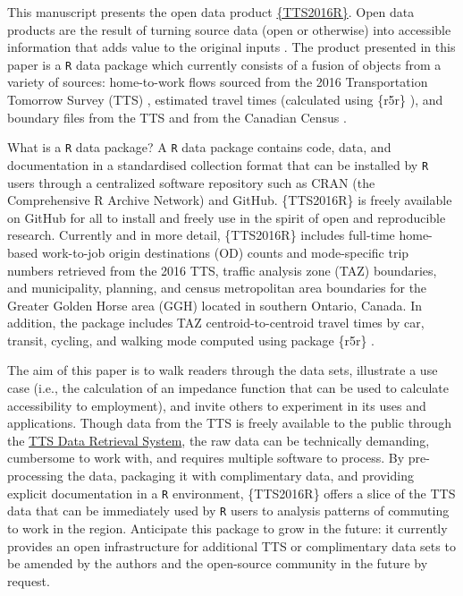 \documentclass[Royal,times,sageh]{sagej}
\begin{document}
This manuscript presents the open data product
\href{https://github.com/soukhova/TTS2016R}{\{TTS2016R\}}. Open data
products are the result of turning source data (open or otherwise) into
accessible information that adds value to the original inputs
\citep[see][]{Arribas2021open}. The product presented in this paper is a
\texttt{R} data package which currently consists of a fusion of objects
from a variety of sources: home-to-work flows sourced from the 2016
Transportation Tomorrow Survey (TTS)
\citep{data_management_group_tts_2018}, estimated travel times
(calculated using \{r5r\} \citep{Pereira2021r5r}), and boundary files
from the TTS \citep{datamanagementgroupSurveyBoundaryFiles2018} and from
the Canadian Census \citep{statisticscanadaBoundaryFiles20162017}.

What is a \texttt{R} data package? A \texttt{R} data package contains
code, data, and documentation in a standardised collection format that
can be installed by \texttt{R} users through a centralized software
repository such as CRAN (the Comprehensive R Archive Network) and
GitHub. \{TTS2016R\} is freely available on GitHub for all to install
and freely use in the spirit of open and reproducible research.
Currently and in more detail, \{TTS2016R\} includes full-time home-based
work-to-job origin destinations (OD) counts and mode-specific trip
numbers retrieved from the 2016 TTS, traffic analysis zone (TAZ)
boundaries, and municipality, planning, and census metropolitan area
boundaries for the Greater Golden Horse area (GGH) located in southern
Ontario, Canada. In addition, the package includes TAZ
centroid-to-centroid travel times by car, transit, cycling, and walking
mode computed using package \{r5r\} \citep{Pereira2021r5r}.

The aim of this paper is to walk readers through the data sets,
illustrate a use case (i.e., the calculation of an impedance function
that can be used to calculate accessibility to employment), and invite
others to experiment in its uses and applications. Though data from the
TTS is freely available to the public through the
\href{https://dmg.utoronto.ca/idrs/index}{TTS Data Retrieval System},
the raw data can be technically demanding, cumbersome to work with, and
requires multiple software to process. By pre-processing the data,
packaging it with complimentary data, and providing explicit
documentation in a \texttt{R} environment, \{TTS2016R\} offers a slice
of the TTS data that can be immediately used by \texttt{R} users to
analysis patterns of commuting to work in the region. Anticipate this
package to grow in the future: it currently provides an open
infrastructure for additional TTS or complimentary data sets to be
amended by the authors and the open-source community in the future by
request.
\end{document}
